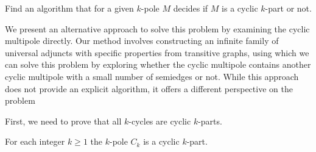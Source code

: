 \documentclass[12pt, twoside]{book}
\begin{document}
\begin{problem}\label{problem:cyclic-part-algorithm}
	Find an algorithm that for a given $k$-pole $M$ decides if $M$ is a cyclic $k$-part or not.
\end{problem}

We present an alternative approach to solve this problem by examining the cyclic multipole directly. Our method involves constructing an infinite family of universal adjuncts with specific properties from transitive graphs, using which we can solve this problem by exploring whether the cyclic multipole contains another cyclic multipole with a small number of semiedges or not. While this approach does not provide an explicit algorithm, it offers a different perspective on the problem

First, we need to prove that all $k$-cycles are cyclic $k$-parts.

\begin{lemma}\label{lem:each-cycle-cyclic-part}
	For each integer $k\geq 1$ the $k$-pole $C_k$ is a cyclic $k$-part. 
\end{lemma}
\end{document}
